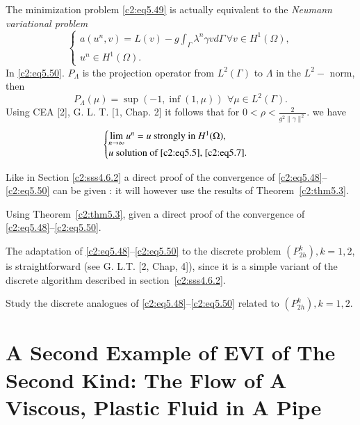 The minimization problem \eqref{c2:eq5.49} is actually equivalent to the
\textit{Neumann variational problem}  
\begin{equation}
\begin{cases}
a(u^n, v) = L(v) - g \int_\Gamma \lambda^n \gamma v d \Gamma\, \forall  v
\in H^1 (\Omega ),\\ 
u^n \in H^1 (\Omega ). 
\end{cases}
\tag{5.51}\label{c2:eq5.51}
\end{equation}
In \eqref{c2:eq5.50}. $P_\Lambda $ is the projection operator from
$L^2 (\Gamma) $ to $\Lambda  $ in the $L^2-$ norm, then  
\begin{equation}
P_\Lambda  (\mu) = \sup (-1, \inf(1, \mu)) ~\, \forall  \mu \in L^2
(\Gamma ). \tag{5.52}\label{c2:eq5.52} 
\end{equation}
Using CEA [2], G. L. T. [1, Chap. 2] it follows that for $0 < \rho <
\frac{2}{g^2 \parallel  \gamma \parallel^2}$. we have 
\begin{equation*}
\begin{cases}
\lim\limits_{n \to \infty} u^n = u \text{ strongly in } H^1 (\Omega
),\\ 
u \text{ solution of \eqref{c2:eq5.5}, \eqref{c2:eq5.7}}. 
\end{cases}
\end{equation*}\pageoriginale 

Like in Section \ref{c2:sss4.6.2} a direct proof of the convergence of 
\eqref{c2:eq5.48}--\eqref{c2:eq5.50} can be given : it will however
use the results of Theorem~\ref{c2:thm5.3}.   

\begin{exercise}\label{c2:exer5.5}%
Using Theorem~\ref{c2:thm5.3}, given a direct proof of the convergence
of \eqref{c2:eq5.48}--\eqref{c2:eq5.50}. 


The adaptation of \eqref{c2:eq5.48}--\eqref{c2:eq5.50} to the discrete
problem $(P^k_{2h}), k=1, 2$, is straightforward (see G. L.T. [2,
  Chap, 4]), since it is a simple variant of the discrete algorithm
described in section~\ref{c2:sss4.6.2}. 
\end{exercise}

\begin{exercise}\label{c2:exer5.6}%
Study the discrete analogues of \eqref{c2:eq5.48}--\eqref{c2:eq5.50}
related to $ (P^k_{2h}), k=1, 2$.  
\end{exercise}

\section[A Second Example of EVI of The...]{A Second Example of EVI of
  The Second Kind: The Flow of A   Viscous, Plastic Fluid in A
  Pipe}\label{c2:s6}  

